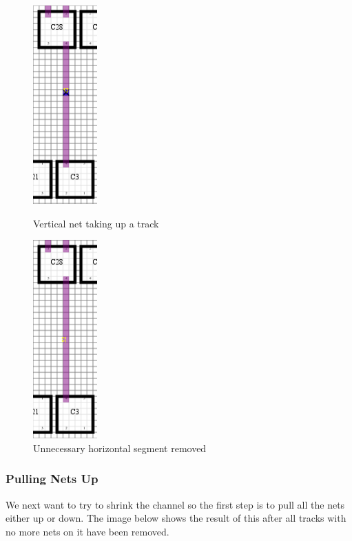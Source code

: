 \documentclass[10pt]{article}
\begin{document}
        \begin{figure}[H]
            \centering
            \begin{minipage}{.5\textwidth}
                \centering
                \includegraphics[height=3in]{./route_2_vertical.png}
                \caption{Vertical net taking up a track}
            \end{minipage}%
            \begin{minipage}{.5\textwidth}
                \centering
                \includegraphics[height=3in]{./route_3_crop.png}
                \caption{Unnecessary horizontal segment removed}
            \end{minipage}
        \end{figure}

    \subsubsection{Pulling Nets Up}

        We next want to try to shrink the channel so the first step is to pull
        all the nets either up or down. The image below shows the result of this
        after all tracks with no more nets on it have been removed.
\end{document}
